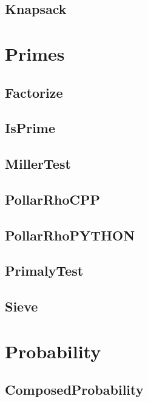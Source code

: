 \subsection{ Knapsack}
\raggedbottom
\hrulefill

\section{Primes}
\subsection{ Factorize}
\raggedbottom
\hrulefill
\subsection{ IsPrime}
\raggedbottom
\hrulefill
\subsection{ MillerTest}
\raggedbottom
\hrulefill
\subsection{ PollarRhoCPP}
\raggedbottom
\hrulefill
\subsection{ PollarRhoPYTHON}
\raggedbottom
\hrulefill
\subsection{ PrimalyTest}
\raggedbottom
\hrulefill
\subsection{ Sieve}
\raggedbottom
\hrulefill

\section{Probability}
\subsection{ ComposedProbability}
\raggedbottom
\hrulefill

